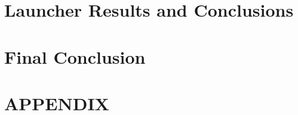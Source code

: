 \section{Launcher Results and Conclusions}
\label{sec:Launcher Results and Conclusions}

\clearpage
\section{Final Conclusion}
\label{sec:Final Conclusion}

\clearpage
\printbibliography


\clearpage
\section{APPENDIX}
\label{sec:APPENDIX}







